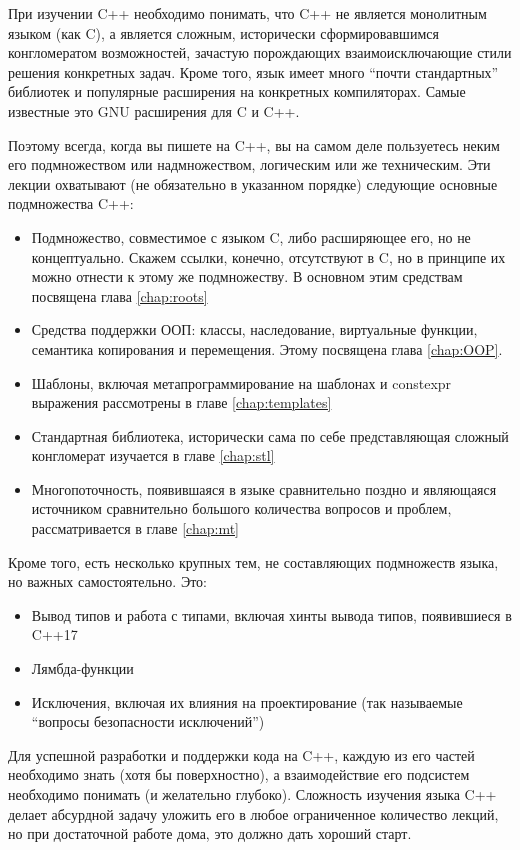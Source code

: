 \documentclass[a4paper,12pt,oneside]{book}
\begin{document}
При изучении C++ необходимо понимать, что C++ не является монолитным языком (как C), а является сложным, исторически сформировавшимся конгломератом возможностей, зачастую порождающих взаимоисключающие стили решения конкретных задач. Кроме того, язык имеет много ``почти стандартных'' библиотек и популярные расширения на конкретных компиляторах. Самые известные это GNU расширения для C и C++. 

Поэтому всегда, когда вы пишете на C++, вы на самом деле пользуетесь неким его подмножеством или надмножеством, логическим или же техническим. Эти лекции охватывают (не обязательно в указанном порядке) следующие основные подмножества C++:

\begin{itemize}
\item
Подмножество, совместимое с языком C, либо расширяющее его, но не концептуально. Скажем ссылки, конечно, отсутствуют в C, но в принципе их можно отнести к этому же подмножеству. В основном этим средствам посвящена глава \ref{chap:roots}
\item
Средства поддержки ООП: классы, наследование, виртуальные функции, семантика копирования и перемещения. Этому посвящена глава \ref{chap:OOP}.
\item
Шаблоны, включая метапрограммирование на шаблонах и constexpr выражения рассмотрены в главе \ref{chap:templates}
\item
Стандартная библиотека, исторически сама по себе представляющая сложный конгломерат изучается в главе \ref{chap:stl}
\item
Многопоточность, появившаяся в языке сравнительно поздно и являющаяся источником сравнительно большого количества вопросов и проблем, рассматривается в главе \ref{chap:mt}
\end{itemize}

Кроме того, есть несколько крупных тем, не составляющих подмножеств языка, но важных самостоятельно. Это:

\begin{itemize}
\item
Вывод типов и работа с типами, включая хинты вывода типов, появившиеся в C++17
\item
Лямбда-функции
\item
Исключения, включая их влияния на проектирование (так называемые ``вопросы безопасности исключений'')
\end{itemize}

Для успешной разработки и поддержки кода на C++, каждую из его частей необходимо знать (хотя бы поверхностно), а взаимодействие его подсистем необходимо понимать (и желательно глубоко). Сложность изучения языка C++ делает абсурдной задачу уложить его в любое ограниченное количество лекций, но при достаточной работе дома, это должно дать хороший старт.
\end{document}
